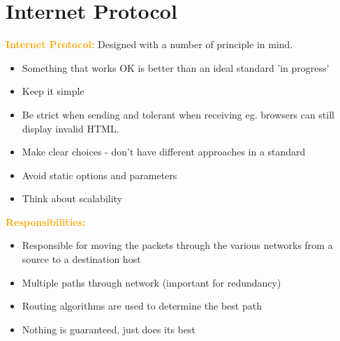 \documentclass[a4paper,10pt]{article}
\begin{document}
\section{Internet Protocol}
\textcolor{Orange}{\textbf{Internet Protocol:}} Designed with a number of principle in mind. 
\begin{itemize}
	\item Something that works OK is better than an ideal standard 'in progress'
	\item Keep it simple 
	\item Be strict when sending and tolerant when receiving eg. browsers can still display invalid HTML. 
	\item Make clear choices - don't have different approaches in a standard 
	\item Avoid static options and parameters 
	\item Think about scalability
\end{itemize}
\textcolor{Orange}{\textbf{Responsibilities:}}
\begin{itemize}
	\item Responsible for moving the packets through the various networks from a source to a destination host
	\item Multiple paths through network (important for redundancy)
	\item Routing algorithms are used to determine the best path 
	\item Nothing is guaranteed, just does its best
\end{itemize}
\end{document}
